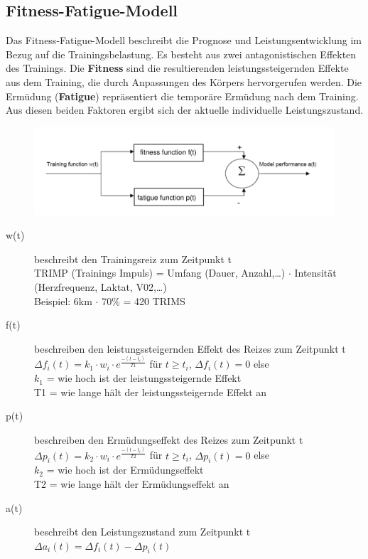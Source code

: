 \subsection{Fitness-Fatigue-Modell}
Das Fitness-Fatigue-Modell beschreibt die Prognose und Leistungsentwicklung im Bezug auf die Trainingsbelastung.
Es besteht aus zwei antagonistischen Effekten des Trainings.
Die \textbf{Fitness} sind die resultierenden leistungssteigernden Effekte aus dem Training, die durch Anpassungen des Körpers hervorgerufen werden.
Die Ermüdung (\textbf{Fatigue}) repräsentiert die temporäre Ermüdung nach dem Training.
Aus diesen beiden Faktoren ergibt sich der aktuelle individuelle Leistungszustand.
\begin{figure}[H]
  \centering
  \includegraphics[width=.7\textwidth]{pictures/trainingssteuerung_ffm_trainingsfunction.png}
\end{figure}
\begin{description}
  \item[w(t)] beschreibt den Trainingsreiz zum Zeitpunkt t\\
    TRIMP (Trainings Impuls) = Umfang (Dauer, Anzahl,\ldots) $\cdot$ Intensität (Herzfrequenz, Laktat, V02,\ldots)\\
    Beispiel: 6km $\cdot$ 70\% = 420 TRIMS
  \item[f(t)] beschreiben den leistungssteigernden Effekt des Reizes zum Zeitpunkt t\\
    $\Delta f_i(t)=k_1 \cdot w_i \cdot e^{\frac{-(t-t_i)}{T1}}$ für $t\geq t_i$, $\Delta f_i(t)=0$ else\\
    $k_1$ = wie hoch ist der leistungssteigernde Effekt\\
    T1 = wie lange hält der leistungssteigernde Effekt an
  \item[p(t)] beschreiben den Ermüdungseffekt des Reizes zum Zeitpunkt t\\
    $\Delta p_i(t)=k_2 \cdot w_i \cdot e^{\frac{-(t-t_i)}{T2}}$ für $t\geq t_i$, $\Delta p_i(t)=0$ else\\
    $k_2$ = wie hoch ist der Ermüdungseffekt\\
    T2 = wie lange hält der Ermüdungseffekt an
  \item[a(t)] beschreibt den Leistungszustand zum Zeitpunkt t\\
    $\Delta a_i(t)=\Delta f_i(t) - \Delta p_i(t)$
\end{description}
